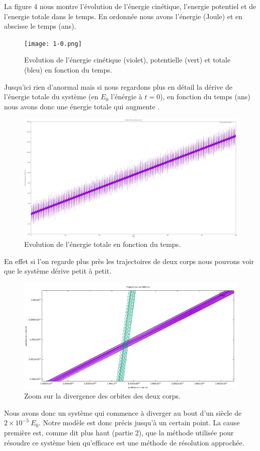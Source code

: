 \documentclass[a4paper]{article}
\begin{document}
La figure 4 nous montre l'évolution de l'énergie cinétique, l'energie potentiel et de l'energie totale dans le temps. En ordonnée nous avons l'énergie  (Joule) et en abscisse le temps (ans).

\begin{figure}[h]
\centering
\texttt{[image: 1-0.png]}
\caption{Evolution de l'énergie cinétique (violet), potentielle (vert) et totale (bleu) en fonction du temps.}
\end{figure}
\newpage

Jusqu'ici rien d'anormal mais si nous regardons plus en détail la dérive de l'énergie totale du système (en $E_0$ l'énérgie à $t = 0$), en fonction du temps (ans) nous avons donc une énergie totale qui augmente .

\begin{figure}[h]
\centering
\includegraphics[width=\textwidth]{Der.png}
\caption{Evolution de l'énergie totale en fonction du temps.}
\end{figure}

En effet si l'on regarde plus près les trajectoires de deux corps nous pouvons voir que le système dérive petit à petit.

\begin{figure}[h]
\centering
\includegraphics[width=\textwidth]{3.png}
\caption{Zoom sur la divergence des orbites des deux corps.}
\end{figure}

Nous avons donc un système qui commence à diverger au bout d'un siècle de $2 \times 10^{-5}~E_0$. Notre modèle est donc précis jusqu'à un certain point. La cause première est, comme dit plus haut (partie 2), que la méthode utilisée pour résoudre ce système bien qu'efficace est une méthode de résolution approchée.
\end{document}

